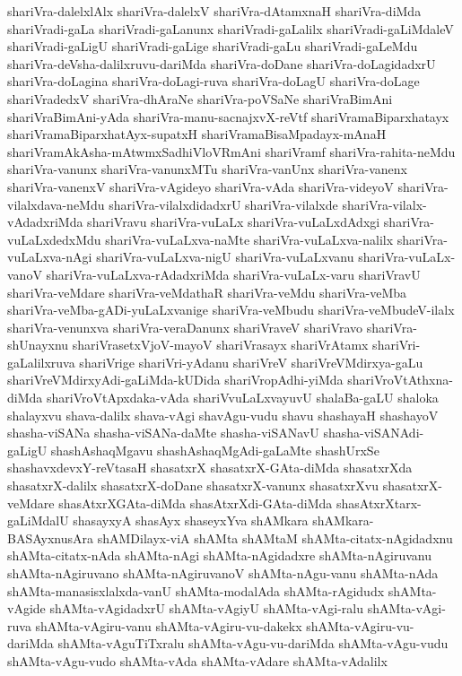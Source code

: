 {shariVra-dalelxlAlx
shariVra-dalelxV
shariVra-dAtamxnaH
shariVra-diMda
shariVradi-gaLa
shariVradi-gaLanunx
shariVradi-gaLalilx
shariVradi-gaLiMdaleV
shariVradi-gaLigU
shariVradi-gaLige
shariVradi-gaLu
shariVradi-gaLeMdu
shariVra-deVsha-dalilxruvu-dariMda
shariVra-doDane
shariVra-doLagidadxrU
shariVra-doLagina
shariVra-doLagi-ruva
shariVra-doLagU
shariVra-doLage
shariVradedxV
shariVra-dhAraNe
shariVra-poVSaNe
shariVraBimAni
shariVraBimAni-yAda
shariVra-manu-sacnajxvX-reVtf
shariVramaBiparxhatayx
shariVramaBiparxhatAyx-supatxH
shariVramaBisaMpadayx-mAnaH
shariVramAkAsha-mAtwmxSadhiVloVRmAni
shariVramf
shariVra-rahita-neMdu
shariVra-vanunx
shariVra-vanunxMTu
shariVra-vanUnx
shariVra-vanenx
shariVra-vanenxV
shariVra-vAgideyo
shariVra-vAda
shariVra-videyoV
shariVra-vilalxdava-neMdu
shariVra-vilalxdidadxrU
shariVra-vilalxde
shariVra-vilalx-vAdadxriMda
shariVravu
shariVra-vuLaLx
shariVra-vuLaLxdAdxgi
shariVra-vuLaLxdedxMdu
shariVra-vuLaLxva-naMte
shariVra-vuLaLxva-nalilx
shariVra-vuLaLxva-nAgi
shariVra-vuLaLxva-nigU
shariVra-vuLaLxvanu
shariVra-vuLaLx-vanoV
shariVra-vuLaLxva-rAdadxriMda
shariVra-vuLaLx-varu
shariVravU
shariVra-veMdare
shariVra-veMdathaR
shariVra-veMdu
shariVra-veMba
shariVra-veMba-gADi-yuLaLxvanige
shariVra-veMbudu
shariVra-veMbudeV-ilalx
shariVra-venunxva
shariVra-veraDanunx
shariVraveV
shariVravo
shariVra-shUnayxnu
shariVrasetxVjoV-mayoV
shariVrasayx
shariVrAtamx
shariVri-gaLalilxruva
shariVrige
shariVri-yAdanu
shariVreV
shariVreVMdirxya-gaLu
shariVreVMdirxyAdi-gaLiMda-kUDida
shariVropAdhi-yiMda
shariVroVtAthxna-diMda
shariVroVtApxdaka-vAda
shariVvuLaLxvayuvU
shalaBa-gaLU
shaloka
shalayxvu
shava-dalilx
shava-vAgi
shavAgu-vudu
shavu
shashayaH
shashayoV
shasha-viSANa
shasha-viSANa-daMte
shasha-viSANavU
shasha-viSANAdi-gaLigU
shashAshaqMgavu
shashAshaqMgAdi-gaLaMte
shashUrxSe
shashavxdevxY-reVtasaH
shasatxrX
shasatxrX-GAta-diMda
shasatxrXda
shasatxrX-dalilx
shasatxrX-doDane
shasatxrX-vanunx
shasatxrXvu
shasatxrX-veMdare
shasAtxrXGAta-diMda
shasAtxrXdi-GAta-diMda
shasAtxrXtarx-gaLiMdalU
shasayxyA
shasAyx
shaseyxYva
shAMkara
shAMkara-BASAyxnusAra
shAMDilayx-viA
shAMta
shAMtaM
shAMta-citatx-nAgidadxnu
shAMta-citatx-nAda
shAMta-nAgi
shAMta-nAgidadxre
shAMta-nAgiruvanu
shAMta-nAgiruvano
shAMta-nAgiruvanoV
shAMta-nAgu-vanu
shAMta-nAda
shAMta-manasisxlalxda-vanU
shAMta-modalAda
shAMta-rAgidudx
shAMta-vAgide
shAMta-vAgidadxrU
shAMta-vAgiyU
shAMta-vAgi-ralu
shAMta-vAgi-ruva
shAMta-vAgiru-vanu
shAMta-vAgiru-vu-dakekx
shAMta-vAgiru-vu-dariMda
shAMta-vAguTiTxralu
shAMta-vAgu-vu-dariMda
shAMta-vAgu-vudu
shAMta-vAgu-vudo
shAMta-vAda
shAMta-vAdare
shAMta-vAdalilx
}

